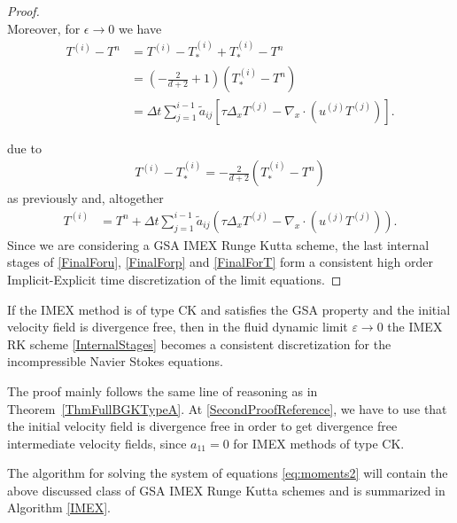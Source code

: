 \documentclass[final,11pt]{siamart251216}
\numberwithin{equation}{section}
\theoremstyle{definition}
\theoremstyle{remark}
\begin{document}
\begin{proof}
\begin{equation}
\end{equation}
Moreover, 
for $\epsilon \rightarrow 0$ we have 
\begin{align*}
T^{(i)} - T^n &= T^{(i)} - T_*^{(i)} + T_*^{(i)} - T^n \\
&= \left( -\frac{2}{d+2} + 1 \right) (T_*^{(i)} - T^n) \\
&= \Delta t \sum_{j=1}^{i-1} \tilde{a}_{ij} \left[ \tau \Delta_x T^{(j)} - \nabla_x \cdot (u^{(j)} T^{(j)}) \right].
\end{align*}

due to
\begin{eqnarray*}
	T^{(i)}-T_*^{(i)} 	
	= -\frac{2}{d+2}(T_*^{(i)}  -T^n )
\end{eqnarray*}
as previously and, altogether
\begin{equation}\begin{split} \label{FinalForT}
		T^{(i)} &= T^n + \Delta t\sum_{j=1}^{i-1} \tilde{a}_{ij} \left( \tau \Delta_x T^{(j)} - \nabla_x \cdot (u^{(j)}T^{(j)}) \right).
	\end{split}
\end{equation}
Since we are considering a GSA IMEX Runge Kutta scheme, the last internal stages of \eqref{FinalForu}, \eqref{FinalForp} and \eqref{FinalForT} form a consistent high order Implicit-Explicit time discretization of the limit equations.
\end{proof}

\begin{theorem}
	If the IMEX method is of type CK and satisfies the GSA property and the initial velocity field is divergence free, then in the fluid dynamic limit $\varepsilon \rightarrow 0$ the IMEX RK scheme \eqref{InternalStages} becomes a consistent discretization for the incompressible Navier Stokes equations.
\end{theorem}
The proof mainly follows the same line of reasoning as in Theorem~\ref{ThmFullBGKTypeA}. At \eqref{SecondProofReference}, we have to use that the initial velocity field is divergence free in order to get divergence free intermediate velocity fields, since $a_{11}= 0$ for IMEX methods of type CK.


The algorithm for solving the system of equations \eqref{eq:moments2} will contain the above discussed class of GSA IMEX Runge Kutta schemes and is summarized in Algorithm \ref{IMEX}.
\end{document}
